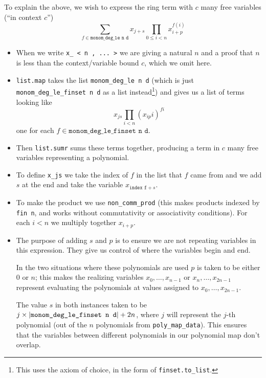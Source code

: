 To explain the above, we wish to express the ring term with $c$ many free variables
(``in context $c$'')
\[\sum_{f \in \texttt{monom\_deg\_le n d}} x_{j+s} \prod_{0 \le i < n} x_{i+p}^{f(i)}\]
\begin{itemize}
  \item When we write \texttt{x\_ < n , ... >} we are giving a natural $n$
        and a proof that $n$ is less than the context/variable bound $c$,
        which we omit here.
  \item \texttt{list.map} takes the list \texttt{monom\_deg\_le n d}
        (which is just \texttt{monom\_deg\_le\_finset n d} as a list instead\footnote{
          This uses the axiom of choice, in the form of \texttt{finset.to\_list}.})
        and gives us a list of terms looking like
        \[x_{js} \prod_{i < n} (x_{ip} i) ^{f i}\] one for each
        $f \in \texttt{monom\_deg\_le\_finset n d}$.
  \item Then \texttt{list.sumr} sums these terms together,
        producing a term in $c$ many free variables representing a polynomial.
  \item To define \texttt{x\_js} we take the index of $f$ in the list that $f$ came from
        and we add $s$ at the end and take the variable $x_{\texttt{index f} + s}$.
  \item To make the product we use \texttt{non\_comm\_prod}
        (this makes products indexed by \texttt{fin n},
        and works without commutativity or associativity conditions).
        For each $i < n$ we multiply together $x_{i + p}$.
  \item The purpose of adding $s$ and $p$ is to ensure we are not repeating variables in
        this expression. They give us control of where the variables begin and end.

        In the two situations where these polynomials are used $p$ is taken to be
        either $0$ or $n$; this makes the realizing variables $x_{0},\dots,x_{n - 1}$
        or $x_{n}, \dots, x_{2n - 1}$ represent evaluating the polynomials at values
        assigned to $x_{0},\dots,x_{2n - 1}$.

        The value $s$ in both instances taken to be
        $j \times \left\vert \texttt{monom\_deg\_le\_finset n d} \right\vert + 2n$, where
        $j$ will represent the $j$-th polynomial
        (out of the $n$ polynomials from \texttt{poly\_map\_data}).
        This ensures that the variables between different polynomials
        in our polynomial map don't overlap.
\end{itemize}

